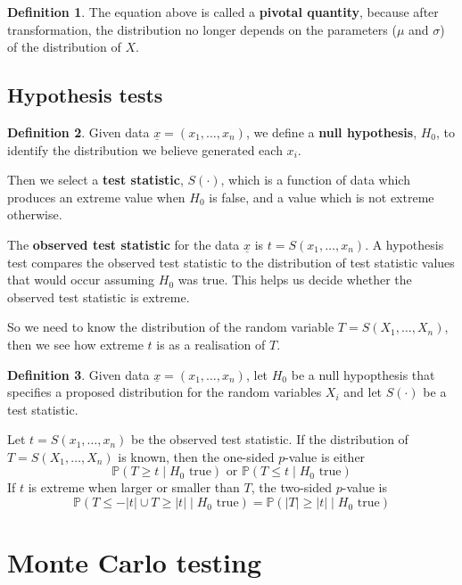 \documentclass[12pt,a4paper]{article}
\theoremstyle{definition}
\newtheorem{definition}{Definition}[subsection]
\begin{document}
\begin{definition}
	The equation above is called a \textbf{pivotal quantity}, because after transformation, the distribution no longer depends on the parameters ($\mu$ and $\sigma$) of the distribution of $X$.
\end{definition}

\subsection{Hypothesis tests}

\begin{definition}
	Given data $\underline{x} = (x_1, \dots, x_n)$, we define a \textbf{null hypothesis}, $H_0$, to identify the distribution we believe generated each $x_i$.

	Then we select a \textbf{test statistic}, $S(\cdot)$, which is a function of data which produces an extreme value when $H_0$ is false, and a value which is not extreme otherwise.

	The \textbf{observed test statistic} for the data $\underline{x}$ is $t = S(x_1, \dots, x_n)$. A hypothesis test compares the observed test statistic to the distribution of test statistic values that would occur assuming $H_0$ was true. This helps us decide whether the observed test statistic is extreme.

	So we need to know the distribution of the random variable $T = S(X_1, \dots, X_n)$, then we see how extreme $t$ is as a realisation of $T$.
\end{definition}

\begin{definition}
	Given data $\underline{x} = (x_1, \dots, x_n)$, let $H_0$ be a null hypopthesis that specifies a proposed distribution for the random variables $X_i$ and let $S(\cdot)$ be a test statistic.

	Let $t = S(x_1, \dots, x_n)$ be the observed test statistic. If the distribution of $T = S(X_1, \dots, X_n)$ is known, then the one-sided $p$-value is either
	\[
		\mathbb{P}(T \ge t \mid H_0 \text{ true}) \text{ \ or \ } \mathbb{P}(T \le t \mid H_0 \text{ true})
	\]
	If $t$ is extreme when larger or smaller than $T$, the two-sided $p$-value is
	\[
		\mathbb{P}(T \le -|t| \cup T \ge |t| \mid H_0 \text{ true} ) = \mathbb{P}(|T| \ge |t| \mid H_0 \text{ true})
	\]
\end{definition}

\section{Monte Carlo testing}
\end{document}
